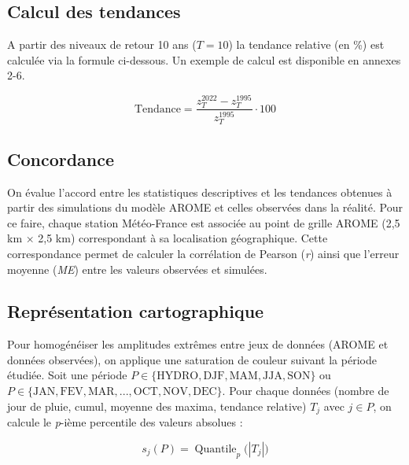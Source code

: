 \documentclass[
  article,
  nofooter,
  noheadings]{jss}
\begin{document}
\subsection{Calcul des tendances}\label{calcul-des-tendances}

A partir des niveaux de retour 10 ans (\(T = 10\)) la tendance relative
(en \%) est calculée via la formule ci-dessous. Un exemple de calcul est
disponible en annexes 2-6.

\begin{tcolorbox}[enhanced jigsaw, breakable, bottomrule=.15mm, rightrule=.15mm, left=2mm, leftrule=.75mm, opacityback=0, colback=white, arc=.35mm, toprule=.15mm, colframe=quarto-callout-color-frame]

\[
\text{Tendance} = \frac{z_T^{2022} - z_T^{1995}}{z_T^{1995}} \cdot {100}
\]

\end{tcolorbox}

\subsection{Concordance}\label{concordance}

On évalue l'accord entre les statistiques descriptives et les tendances
obtenues à partir des simulations du modèle AROME et celles observées
dans la réalité. Pour ce faire, chaque station Météo-France est associée
au point de grille AROME (2,5 km × 2,5 km) correspondant à sa
localisation géographique. Cette correspondance permet de calculer la
corrélation de Pearson (\emph{r}) ainsi que l'erreur moyenne (\emph{ME})
entre les valeurs observées et simulées.

\subsection{Représentation
cartographique}\label{repruxe9sentation-cartographique}

Pour homogénéiser les amplitudes extrêmes entre jeux de données (AROME
et données observées), on applique une saturation de couleur suivant la
période étudiée. Soit une période
\(P \in \{\text{HYDRO}, \text{DJF},\text{MAM},\text{JJA},\text{SON}\}\)
ou
\(P \in \{\text{JAN},\text{FEV},\text{MAR},\text{...},\text{OCT},\text{NOV},\text{DEC}\}\).
Pour chaque données (nombre de jour de pluie, cumul, moyenne des maxima,
tendance relative) \(T_j\) avec \(j \in P\), on calcule le \emph{p}-ième
percentile des valeurs absolues :

\[
s_j(P)=\operatorname{Quantile}_{p}\big(|T_j|\big)
\]
\end{document}
